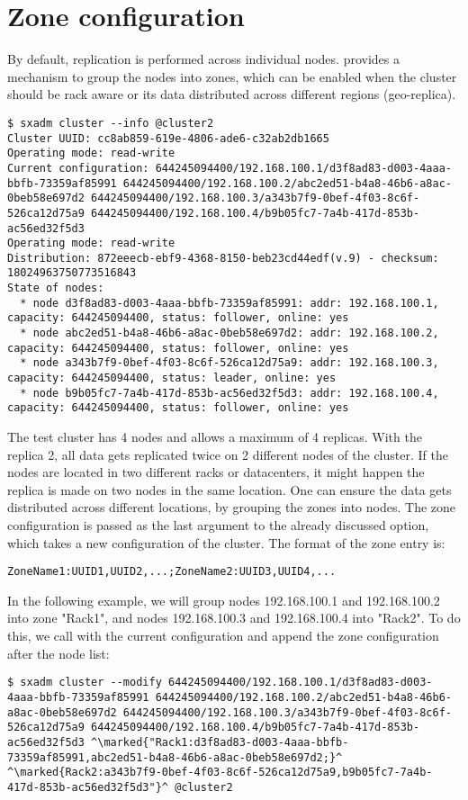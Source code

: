 \section{Zone configuration}
By default, replication is performed across individual nodes. \SX provides
a mechanism to group the nodes into zones, which can be enabled when the
cluster should be rack aware or its data distributed across different regions
(geo-replica).
\begin{lstlisting}
$ sxadm cluster --info @cluster2
Cluster UUID: cc8ab859-619e-4806-ade6-c32ab2db1665
Operating mode: read-write
Current configuration: 644245094400/192.168.100.1/d3f8ad83-d003-4aaa-bbfb-73359af85991 644245094400/192.168.100.2/abc2ed51-b4a8-46b6-a8ac-0beb58e697d2 644245094400/192.168.100.3/a343b7f9-0bef-4f03-8c6f-526ca12d75a9 644245094400/192.168.100.4/b9b05fc7-7a4b-417d-853b-ac56ed32f5d3 
Operating mode: read-write
Distribution: 872eeecb-ebf9-4368-8150-beb23cd44edf(v.9) - checksum: 18024963750773516843
State of nodes:
  * node d3f8ad83-d003-4aaa-bbfb-73359af85991: addr: 192.168.100.1, capacity: 644245094400, status: follower, online: yes
  * node abc2ed51-b4a8-46b6-a8ac-0beb58e697d2: addr: 192.168.100.2, capacity: 644245094400, status: follower, online: yes
  * node a343b7f9-0bef-4f03-8c6f-526ca12d75a9: addr: 192.168.100.3, capacity: 644245094400, status: leader, online: yes
  * node b9b05fc7-7a4b-417d-853b-ac56ed32f5d3: addr: 192.168.100.4, capacity: 644245094400, status: follower, online: yes
\end{lstlisting}
The test cluster has 4 nodes and allows a maximum of 4 replicas. With the
replica 2, all data gets replicated twice on 2 different nodes of the
cluster. If the nodes are located in two different racks or datacenters,
it might happen the replica is made on two nodes in the same location.
One can ensure the data gets distributed across different locations, by
grouping the zones into nodes. The zone configuration is passed as the
last argument to the already discussed  option,
which takes a new configuration of the cluster. The format of the zone entry is:
\begin{lstlisting}
ZoneName1:UUID1,UUID2,...;ZoneName2:UUID3,UUID4,...
\end{lstlisting}
In the following example, we will group nodes 192.168.100.1 and
192.168.100.2 into zone "Rack1", and nodes 192.168.100.3 and
192.168.100.4 into "Rack2". To do this, we call 
with the current configuration and append the zone configuration after
the node list:
\begin{lstlisting}
$ sxadm cluster --modify 644245094400/192.168.100.1/d3f8ad83-d003-4aaa-bbfb-73359af85991 644245094400/192.168.100.2/abc2ed51-b4a8-46b6-a8ac-0beb58e697d2 644245094400/192.168.100.3/a343b7f9-0bef-4f03-8c6f-526ca12d75a9 644245094400/192.168.100.4/b9b05fc7-7a4b-417d-853b-ac56ed32f5d3 ^\marked{"Rack1:d3f8ad83-d003-4aaa-bbfb-73359af85991,abc2ed51-b4a8-46b6-a8ac-0beb58e697d2;}^ ^\marked{Rack2:a343b7f9-0bef-4f03-8c6f-526ca12d75a9,b9b05fc7-7a4b-417d-853b-ac56ed32f5d3"}^ @cluster2
\end{lstlisting}
